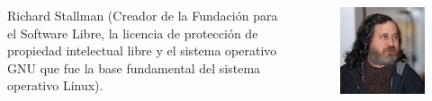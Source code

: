\documentclass[aspectratio=169]{beamer}
\begin{document}
\begin{frame}
\begin{columns}
\begin{column}{0.5\textwidth}
Richard Stallman (Creador de la Fundación para el Software Libre, la licencia de protección de propiedad intelectual libre y el sistema operativo GNU que fue la base fundamental del sistema operativo Linux).\\
\end{column}
\begin{column}{0.5\textwidth}
\begin{figure}
\includegraphics[width=.6\textwidth]{Stallman.png}
\end{figure}   
\end{column}
\end{columns}
\end{frame}
\end{document}
